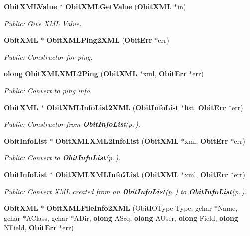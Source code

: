 \begin{CompactItemize}
{\bf Obit\-XMLValue} $\ast$ {\bf Obit\-XMLGet\-Value} ({\bf Obit\-XML} $\ast$in)
\begin{CompactList}\small\item\em Public: Give XML Value. \item\end{CompactList}\item 
{\bf Obit\-XML} $\ast$ {\bf Obit\-XMLPing2XML} ({\bf Obit\-Err} $\ast$err)
\begin{CompactList}\small\item\em Public: Constructor for ping. \item\end{CompactList}\item 
{\bf olong} {\bf Obit\-XMLXML2Ping} ({\bf Obit\-XML} $\ast$xml, {\bf Obit\-Err} $\ast$err)
\begin{CompactList}\small\item\em Public: Convert to ping info. \item\end{CompactList}\item 
{\bf Obit\-XML} $\ast$ {\bf Obit\-XMLInfo\-List2XML} ({\bf Obit\-Info\-List} $\ast$list, {\bf Obit\-Err} $\ast$err)
\begin{CompactList}\small\item\em Public: Constructor from {\bf Obit\-Info\-List}{\rm (p.\,\pageref{structObitInfoList})}. \item\end{CompactList}\item 
{\bf Obit\-Info\-List} $\ast$ {\bf Obit\-XMLXML2Info\-List} ({\bf Obit\-XML} $\ast$xml, {\bf Obit\-Err} $\ast$err)
\begin{CompactList}\small\item\em Public: Convert to {\bf Obit\-Info\-List}{\rm (p.\,\pageref{structObitInfoList})}. \item\end{CompactList}\item 
{\bf Obit\-Info\-List} $\ast$ {\bf Obit\-XMLXMLInfo2List} ({\bf Obit\-XML} $\ast$xml, {\bf Obit\-Err} $\ast$err)
\begin{CompactList}\small\item\em Public: Convert XML created from an {\bf Obit\-Info\-List}{\rm (p.\,\pageref{structObitInfoList})} to {\bf Obit\-Info\-List}{\rm (p.\,\pageref{structObitInfoList})}. \item\end{CompactList}\item 
{\bf Obit\-XML} $\ast$ {\bf Obit\-XMLFile\-Info2XML} (Obit\-IOType Type, gchar $\ast$Name, gchar $\ast$AClass, gchar $\ast$ADir, {\bf olong} ASeq, {\bf olong} AUser, {\bf olong} Field, {\bf olong} NField, {\bf Obit\-Err} $\ast$err)

\end{CompactItemize}
